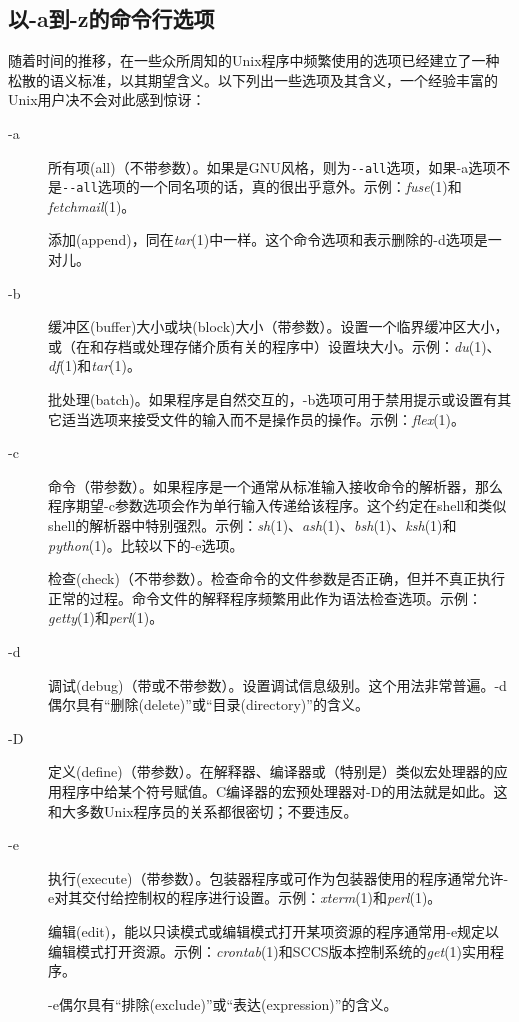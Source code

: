 \documentclass[12pt,oneside]{book}
\begin{document}
\subsection{以-a到-z的命令行选项}
随着时间的推移，在一些众所周知的Unix程序中频繁使用的选项已经建立了一种松散的语义标准，以其期望含义。以下列出一些选项及其含义，一个经验丰富的Unix用户决不会对此感到惊讶：
\begin{description}
\item[-a] 所有项(all)（不带参数）。如果是GNU风格，则为\verb+--all+选项，如果-a选项不是\verb+--all+选项的一个同名项的话，真的很出乎意外。示例：\textit{fuse}(1)和\textit{fetchmail}(1)。

添加(append)，同在\textit{tar}(1)中一样。这个命令选项和表示删除的-d选项是一对儿。
\item[-b] 缓冲区(buffer)大小或块(block)大小（带参数）。设置一个临界缓冲区大小，或（在和存档或处理存储介质有关的程序中）设置块大小。示例：\textit{du}(1)、\textit{df}(1)和\textit{tar}(1)。

批处理(batch)。如果程序是自然交互的，-b选项可用于禁用提示或设置有其它适当选项来接受文件的输入而不是操作员的操作。示例：\textit{flex}(1)。
\item[-c] 命令（带参数）。如果程序是一个通常从标准输入接收命令的解析器，那么程序期望-c参数选项会作为单行输入传递给该程序。这个约定在shell和类似shell的解析器中特别强烈。示例：\textit{sh}(1)、\textit{ash}(1)、\textit{bsh}(1)、\textit{ksh}(1)和\textit{python}(1)。比较以下的-e选项。

检查(check)（不带参数）。检查命令的文件参数是否正确，但并不真正执行正常的过程。命令文件的解释程序频繁用此作为语法检查选项。示例：\textit{getty}(1)和\textit{perl}(1)。
\item[-d] 调试(debug)（带或不带参数）。设置调试信息级别。这个用法非常普遍。-d偶尔具有“删除(delete)”或“目录(directory)”的含义。
\item[-D] 定义(define)（带参数）。在解释器、编译器或（特别是）类似宏处理器的应用程序中给某个符号赋值。C编译器的宏预处理器对-D的用法就是如此。这和大多数Unix程序员的关系都很密切；不要违反。
\item[-e] 执行(execute)（带参数）。包装器程序或可作为包装器使用的程序通常允许-e对其交付给控制权的程序进行设置。示例：\textit{xterm}(1)和\textit{perl}(1)。

编辑(edit)，能以只读模式或编辑模式打开某项资源的程序通常用-e规定以编辑模式打开资源。示例：\textit{crontab}(1)和SCCS版本控制系统的\textit{get}(1)实用程序。

-e偶尔具有“排除(exclude)”或“表达(expression)”的含义。


\end{description}
\end{document}
